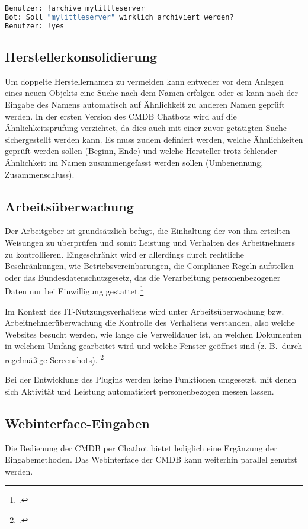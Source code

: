\begin{lstlisting}[language=python, label=delconfirm, caption=Nachfrage bei der Archivierung von Objekten]
Benutzer: !archive mylittleserver
Bot: Soll "mylittleserver" wirklich archiviert werden?
Benutzer: !yes
\end{lstlisting}

\subsection{Herstellerkonsolidierung}
Um doppelte Herstellernamen zu vermeiden kann entweder vor dem Anlegen eines neuen Objekts eine Suche nach dem Namen erfolgen oder es kann nach der Eingabe des Namens automatisch auf Ähnlichkeit zu anderen Namen geprüft werden.
In der ersten Version des \acs{CMDB} Chatbots wird auf die Ähnlichkeitsprüfung verzichtet, da dies auch mit einer zuvor getätigten Suche sichergestellt werden kann. Es muss zudem definiert werden, welche Ähnlichkeiten geprüft werden sollen (Beginn, Ende) und welche Hersteller trotz fehlender Ähnlichkeit im Namen zusammengefasst werden sollen (Umbenennung, Zusammenschluss).

\subsection{Arbeitsüberwachung}
Der Arbeitgeber ist grundsätzlich befugt, die Einhaltung der von ihm erteilten Weisungen zu überprüfen und somit Leistung und Verhalten des Arbeitnehmers zu kontrollieren. Eingeschränkt wird er allerdings durch rechtliche Beschränkungen, wie Betriebsvereinbarungen, die Compliance Regeln aufstellen oder das Bundesdatenschutzgesetz, das die Verarbeitung personenbezogener Daten nur bei Einwilligung gestattet.\footcite[Vgl.][1\psqq]{Rudkowski_2015_Arbeitnehmer}

Im Kontext des IT-Nutzungsverhaltens wird unter Arbeitsüberwachung bzw. Arbeitnehmerüberwachung die Kontrolle des Verhaltens verstanden, also welche Websites besucht werden, wie lange die Verweildauer ist, an welchen Dokumenten in welchem Umfang gearbeitet wird und welche Fenster geöffnet sind (z. B.~durch regelmäßige Screenshots).
\footcite[Vgl.][55]{Rudkowski_2015_Arbeitnehmer}

Bei der Entwicklung des Plugins werden keine Funktionen umgesetzt, mit denen sich Aktivität und Leistung automatisiert personenbezogen messen lassen. 

\subsection{Webinterface-Eingaben}
Die Bedienung der \acs{CMDB} per Chatbot bietet lediglich eine Ergänzung der Eingabemethoden. Das Webinterface der \acs{CMDB} kann weiterhin parallel genutzt werden.

